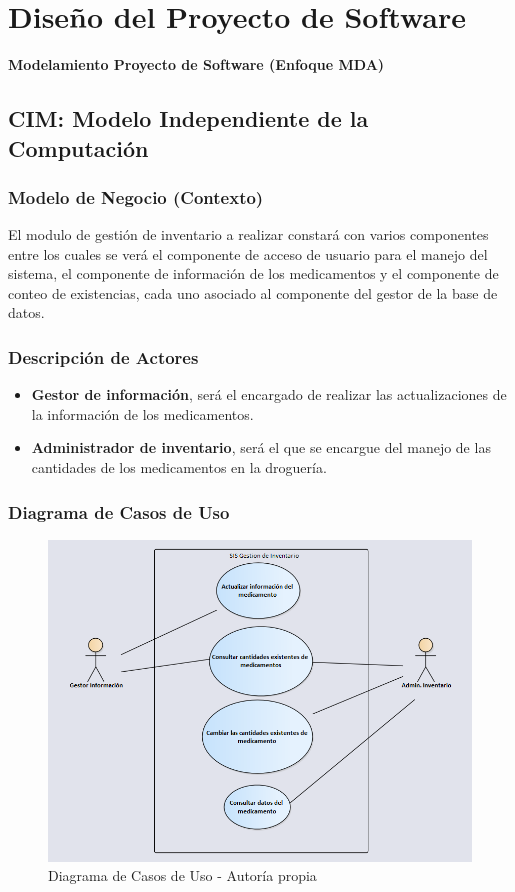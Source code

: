 \chapter{Diseño del Proyecto de Software}
\large{\textbf{Modelamiento Proyecto de Software (Enfoque MDA)}}
\section{CIM: Modelo Independiente de la Computaci\'on}
\subsection{Modelo de Negocio (Contexto)}
El modulo de gesti\'on de inventario a realizar constar\'a con varios componentes
entre los cuales se ver\'a el componente de acceso de usuario para el manejo del
sistema, el componente de informaci\'on de los medicamentos y el componente de
conteo de existencias, cada uno asociado al componente del gestor de la base de datos.
\newpage
\subsection{Descripción de Actores}
\begin{itemize}
\item \textbf{Gestor de informaci\'on}, ser\'a el encargado de realizar las actualizaciones de la informaci\'on de los medicamentos.
    \item \textbf{Administrador de inventario}, ser\'a el que se encargue del manejo de las cantidades de los medicamentos en la droguer\'ia.
\end{itemize}
\subsection{Diagrama de Casos de Uso}
\begin{center}
\begin{figure}[htb]
\centering
\includegraphics[width = 1.0\linewidth]{capitulo5/img/CasosUso.png}
\caption{Diagrama de Casos de Uso - Autor\'ia propia}
\end{figure}
\end{center}
